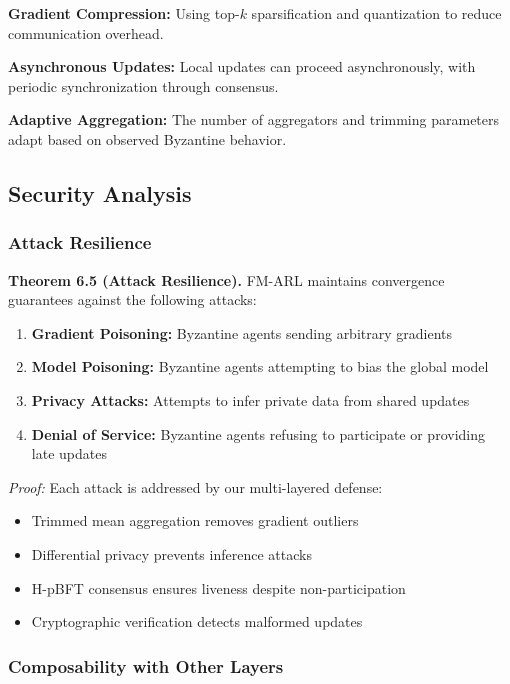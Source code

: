 \documentclass[conference]{IEEEtran}
\begin{document}
\textbf{Gradient Compression:} Using top-$k$ sparsification and quantization to reduce communication overhead.

\textbf{Asynchronous Updates:} Local updates can proceed asynchronously, with periodic synchronization through consensus.

\textbf{Adaptive Aggregation:} The number of aggregators and trimming parameters adapt based on observed Byzantine behavior.

\subsection{Security Analysis}

\subsubsection{Attack Resilience}

\textbf{Theorem 6.5 (Attack Resilience).} FM-ARL maintains convergence guarantees against the following attacks:

\begin{enumerate}
    \item \textbf{Gradient Poisoning:} Byzantine agents sending arbitrary gradients
    \item \textbf{Model Poisoning:} Byzantine agents attempting to bias the global model
    \item \textbf{Privacy Attacks:} Attempts to infer private data from shared updates
    \item \textbf{Denial of Service:} Byzantine agents refusing to participate or providing late updates
\end{enumerate}

\textit{Proof:} Each attack is addressed by our multi-layered defense:
\begin{itemize}
    \item Trimmed mean aggregation removes gradient outliers
    \item Differential privacy prevents inference attacks
    \item H-pBFT consensus ensures liveness despite non-participation
    \item Cryptographic verification detects malformed updates
\end{itemize}

\subsubsection{Composability with Other Layers}
\end{document}
